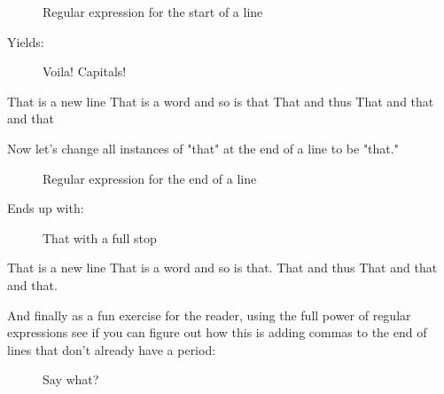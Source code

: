 \documentclass[10pt,american,]{book}
\newenvironment{Shaded}{\begin{snugshade}}{\end{snugshade}}
\newcommand{\KeywordTok}[1]{\textcolor[rgb]{0.13,0.29,0.53}{\textbf{{#1}}}}
\newcommand{\DataTypeTok}[1]{\textcolor[rgb]{0.13,0.29,0.53}{{#1}}}
\newcommand{\OtherTok}[1]{\textcolor[rgb]{0.56,0.35,0.01}{{#1}}}
\newcommand{\NormalTok}[1]{{#1}}
\numberwithin{figure}{chapter}
\DeclareRobustCommand{\drcap}[1]{\begin{figure}[H]\caption{#1}\end{figure}}
\renewcommand{\KeywordTok}[1]{{#1}}
\renewcommand{\DataTypeTok}[1]{{#1}}
\renewcommand{\OtherTok}[1]{{#1}}
\renewcommand{\NormalTok}[1]{{#1}}
\begin{document}
\drcap{Regular expression for the start of a line}

\begin{Shaded}
\end{Shaded}

Yields:

\drcap{Voila! Capitals!}

\begin{Shaded}
\begin{Highlighting}[]
\KeywordTok{That} \NormalTok{is a new line}
\KeywordTok{That} \NormalTok{is a word}
\KeywordTok{and} \NormalTok{so is that}
\KeywordTok{That} \NormalTok{and thus}
\KeywordTok{That} \NormalTok{and that and that}
\end{Highlighting}
\end{Shaded}

Now let's change all instances of "that" at the end of a line to be
"that."

\drcap{Regular expression for the end of a line}

\begin{Shaded}
\end{Shaded}

Ends up with:

\drcap{That with a full stop}

\begin{Shaded}
\begin{Highlighting}[]
\KeywordTok{That} \NormalTok{is a new line}
\KeywordTok{That} \NormalTok{is a word}
\KeywordTok{and} \NormalTok{so is that.}
\KeywordTok{That} \NormalTok{and thus}
\KeywordTok{That} \NormalTok{and that and that.}
\end{Highlighting}
\end{Shaded}

And finally as a fun exercise for the reader, using the full power of
regular expressions see if you can figure out how this is adding commas
to the end of lines that don't already have a period:

\drcap{Say what?}

\begin{Shaded}
\end{Shaded}
\end{document}
